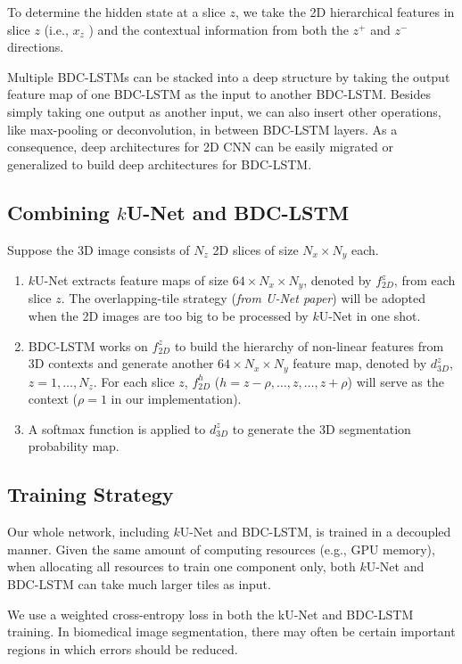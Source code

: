 \documentclass[a4paper,12pt]{article}
\begin{document}
To determine the hidden state at a slice $z$, we take the 2D hierarchical features in slice $z$ (i.e., $x_z$ ) and the contextual information from both the $z^{+}$ and $z^{-}$ directions.

Multiple BDC-LSTMs can be stacked into a deep structure by taking the output feature map of one BDC-LSTM as the input to another BDC-LSTM. Besides simply taking one output as another input, we can also insert other operations, like max-pooling or deconvolution, in between BDC-LSTM layers. As a consequence, deep architectures for 2D CNN can be easily migrated or generalized to build deep architectures for BDC-LSTM.

\subsection{Combining $k$U-Net and BDC-LSTM}

Suppose the 3D image consists of $N_z$ 2D slices of size $N_x \times N_y$ each.

\begin{enumerate}
    \item $k$U-Net extracts feature maps of size $64 \times N_x \times N_y$, denoted by $f^z_{2D}$, from each slice $z$. The overlapping-tile strategy (\emph{from U-Net paper}) will be adopted when the 2D images are too big to be processed by $k$U-Net in one shot.
    \item BDC-LSTM works on $f^z_{2D}$ to build the hierarchy of non-linear features from 3D contexts and generate another $64 \times N_x \times N_y$ feature map, denoted by $d^z_{3D}$, $z = 1, \ldots, N_z$. For each slice $z$, $f^h_{2D}$ ($h = z - \rho, \ldots , z, \ldots , z + \rho$) will serve as the context ($\rho = 1$ in our implementation).
    \item A softmax function is applied to $d^z_{3D}$ to generate the 3D segmentation probability map.
\end{enumerate}

\subsection{Training Strategy}

Our whole network, including $k$U-Net and BDC-LSTM, is trained in a decoupled manner. Given the same amount of computing resources (e.g., GPU memory), when allocating all resources to train one component only, both $k$U-Net and BDC-LSTM can take much larger tiles as input.

We use a weighted cross-entropy loss in both the kU-Net and BDC-LSTM training. In biomedical image segmentation, there may often be certain important regions in which errors should be reduced.
\end{document}
